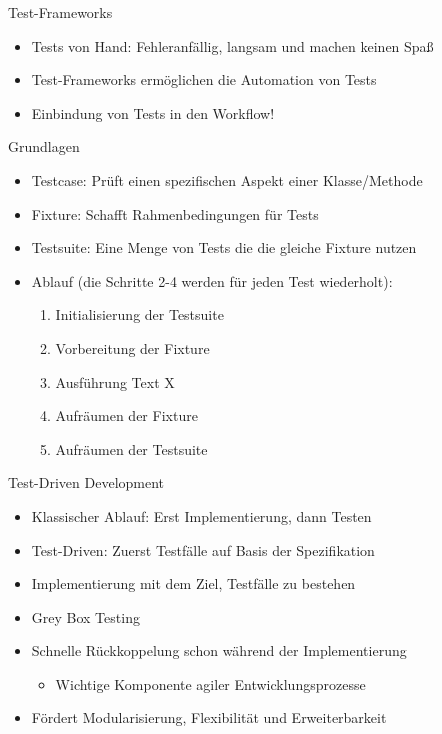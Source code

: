 \begin{frame}{Test-Frameworks}
	\begin{itemize}
		\item Tests von Hand: Fehleranfällig, langsam und machen keinen Spaß
		\item Test-Frameworks ermöglichen die Automation von Tests
		\item Einbindung von Tests in den Workflow!
	\end{itemize}
	
	\begin{block}{Grundlagen}
		\begin{itemize}
			\item Testcase: Prüft einen spezifischen Aspekt einer Klasse/Methode
			\item Fixture: Schafft Rahmenbedingungen für Tests
			\item Testsuite: Eine Menge von Tests die die gleiche Fixture nutzen	
			\item Ablauf (die Schritte 2-4 werden für jeden Test wiederholt):
			\begin{enumerate}
				\item Initialisierung der Testsuite
				\item Vorbereitung der Fixture
				\item Ausführung Text X
				\item Aufräumen der Fixture
				\item Aufräumen der Testsuite
			\end{enumerate}	
		\end{itemize}
	\end{block}
\end{frame}

\begin{frame}{Test-Driven Development}
	\begin{itemize}
		\item Klassischer Ablauf: Erst Implementierung, dann Testen
		\item Test-Driven: Zuerst Testfälle auf Basis der Spezifikation
		\item Implementierung mit dem Ziel, Testfälle zu bestehen
		\item Grey Box Testing
		\item Schnelle Rückkoppelung schon während der Implementierung
		\begin{itemize}
			\item Wichtige Komponente agiler Entwicklungsprozesse
		\end{itemize}
		\item Fördert Modularisierung, Flexibilität und Erweiterbarkeit
	\end{itemize}
\end{frame}

